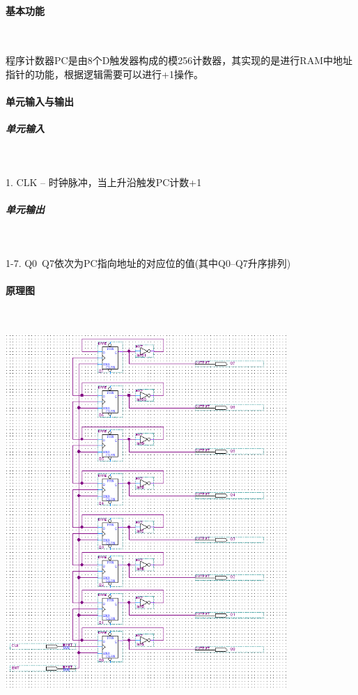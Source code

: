 \documentclass[UTF8]{ctexart}
\begin{document}
    \paragraph{基本功能}

    ~

    程序计数器PC是由8个D触发器构成的模256计数器，其实现的是进行RAM中地址指针的功能，根据逻辑需要可以进行+1操作。

    \paragraph{单元输入与输出}

    \subparagraph{单元输入}

    ~

    1. CLK -- 时钟脉冲，当上升沿触发PC计数+1

    \subparagraph{单元输出}

    ~

    1-7. Q0~Q7依次为PC指向地址的对应位的值(其中Q0--Q7升序排列)

    \paragraph{原理图}

    ~

    \includegraphics[width=0.8\textwidth]{./img/程序计数器PC原理图.png}
\end{document}
